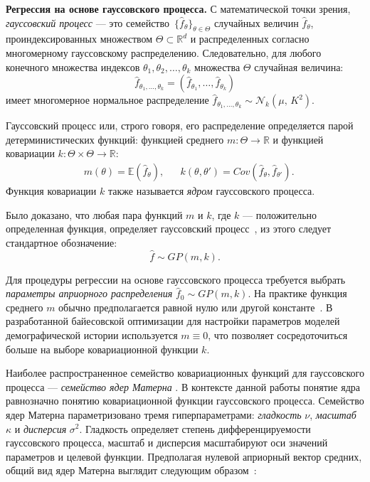 \textbf{Регрессия на основе гауссовского процесса.} 
С математической точки зрения, \emph{гауссовский процесс} --- это семейство~${\{\hat{f}_\theta\}_{\theta \in \mathcal{\Theta}}}$ случайных величин  $\hat{f}_\theta$, проиндексированных множеством $\Theta \subset \mathbb{R}^d$  и распределенных согласно многомерному гауссовскому распределению.
Следовательно, для любого конечного множества индексов $\theta_1, \theta_2, \dots, \theta_k$ множества $\Theta$ случайная величина:
$$\hat{f}_{\theta_1, \dots, \theta_k} = (\hat{f}_{\theta_1}, \dots, \hat{f}_{\theta_k})$$
имеет многомерное нормальное распределение $\hat{f}_{\theta_1, \dots, \theta_k} \sim \mathcal{N}_k(\mu,\, K^{2})$.

Гауссовский процесс или, строго говоря, его распределение определяется парой детерминистических функций: функцией среднего ${m: \Theta \to \mathbb{R}}$ и функцией ковариации $k: \Theta \times \Theta \to \mathbb{R}$:
\begin{align}
    &m(\theta) = \mathbb{E}(\hat{f}_\theta), & & k(\theta, \theta') = Cov(\hat{f}_{\theta}, \hat{f}_{\theta'}).
\end{align}
Функция ковариации $k$ также называется \textit{ядром} гауссовского процесса.

Было доказано, что любая пара функций $m$ и $k$, где $k$ --- положительно определенная функция, определяет гауссовский процесс~\cite{rasmussen2006}, из этого следует стандартное обозначение:
\begin{equation}
    \hat{f} \sim GP(m, k).
\end{equation}

\FloatBarrier

Для процедуры регрессии на основе гауссовского процесса требуется выбрать \emph{параметры априорного распределения} $\hat{f}_{0} \sim GP(m, k)$.
На практике функция среднего $m$ обычно предполагается равной нулю или другой константе~\cite{rasmussen2006}.
В разработанной байесовской оптимизации для настройки параметров моделей демографической истории используется $m  \equiv 0$, что позволяет сосредоточиться больше на выборе ковариационной функции $k$.

Наиболее распространенное семейство ковариационных функций для гауссовского процесса --- \emph{семейство ядер Матерна} \cite{stein2012,rasmussen2006}.
В контексте данной работы понятие ядра равнозначно понятию ковариационной функции гауссовского процесса.
Семейство ядер Матерна параметризовано тремя гиперпараметрами: \emph{гладкость} $\nu$, \emph{масштаб} $\kappa$ и \emph{дисперсия} $\sigma^2$.
Гладкость определяет степень дифференцируемости гауссовского процесса, масштаб и дисперсия масштабируют оси значений параметров и целевой функции.
Предполагая нулевой априорный вектор средних, общий вид ядер Матерна выглядит следующим образом~\cite{gradshteyn2014}:

